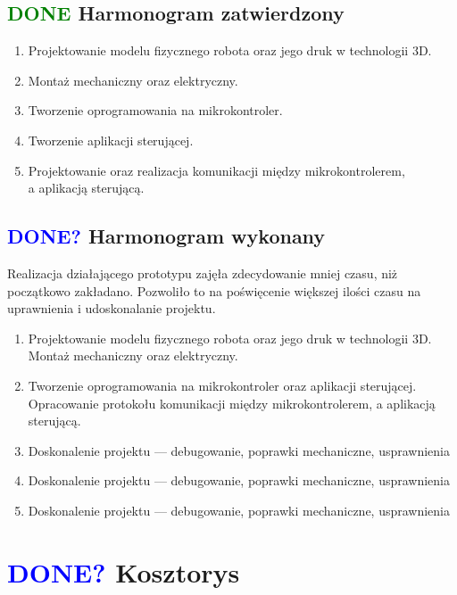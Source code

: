 \documentclass[11pt,titlepage,a4paper]{article}
\begin{document}
\subsection{\textcolor{green}{DONE} Harmonogram zatwierdzony}

\begin{enumerate}
    \item Projektowanie modelu fizycznego robota oraz jego druk w technologii 3D.
    \item Montaż mechaniczny oraz elektryczny.
    \item Tworzenie oprogramowania na mikrokontroler.
    \item Tworzenie aplikacji sterującej.
    \item Projektowanie oraz realizacja komunikacji między mikrokontrolerem, \\a aplikacją sterującą.
\end{enumerate}

\vspace*{2.5cm}

\subsection{\textcolor{blue}{DONE?} Harmonogram wykonany}

Realizacja działającego prototypu zajęła zdecydowanie mniej czasu, niż początkowo zakładano. Pozwoliło to na poświęcenie większej ilości czasu na uprawnienia i udoskonalanie projektu.

\begin{enumerate}
    \item Projektowanie modelu fizycznego robota oraz jego druk w technologii 3D. Montaż mechaniczny oraz elektryczny.
    \item Tworzenie oprogramowania na mikrokontroler oraz aplikacji sterującej. Opracowanie protokołu komunikacji między mikrokontrolerem, a aplikacją sterującą.
    \item Doskonalenie projektu — debugowanie, poprawki mechaniczne, usprawnienia
    \item Doskonalenie projektu — debugowanie, poprawki mechaniczne, usprawnienia
    \item Doskonalenie projektu — debugowanie, poprawki mechaniczne, usprawnienia
\end{enumerate}

\newpage

\section{\textcolor{blue}{DONE?} Kosztorys}
\end{document}

